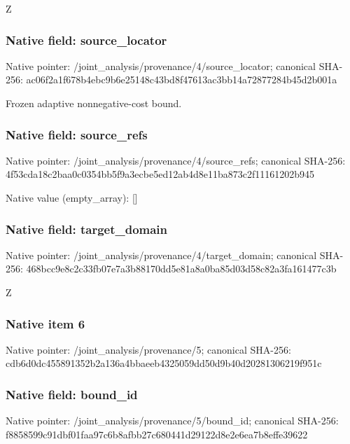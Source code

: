 \documentclass[10pt,a4paper]{article}
\begin{document}
\begingroup\raggedright\sloppy Z\par\endgroup

\subsubsection{Native field: source\_\allowbreak{}locator}
Native pointer: /joint\_\allowbreak{}analysis/provenance/4/source\_\allowbreak{}locator; canonical SHA-256: ac06f2a1f678b4ebc9b6e25148c43bd8f47613ac3bb14a72877284b45d2b001a

\begingroup\raggedright\sloppy Frozen adaptive nonnegative-cost bound.\par\endgroup

\subsubsection{Native field: source\_\allowbreak{}refs}
Native pointer: /joint\_\allowbreak{}analysis/provenance/4/source\_\allowbreak{}refs; canonical SHA-256: 4f53cda18c2baa0c0354bb5f9a3ecbe5ed12ab4d8e11ba873c2f11161202b945

Native value (empty\_\allowbreak{}array): []

\subsubsection{Native field: target\_\allowbreak{}domain}
Native pointer: /joint\_\allowbreak{}analysis/provenance/4/target\_\allowbreak{}domain; canonical SHA-256: 468bcc9e8c2c33fb07e7a3b88170dd5e81a8a0ba85d03d58c82a3fa161477c3b

\begingroup\raggedright\sloppy Z\par\endgroup

\subsubsection{Native item 6}
Native pointer: /joint\_\allowbreak{}analysis/provenance/5; canonical SHA-256: cdb6d0dc455891352b2a136a4bbaeeb4325059dd50d9b40d20281306219f951c

\subsubsection{Native field: bound\_\allowbreak{}id}
Native pointer: /joint\_\allowbreak{}analysis/provenance/5/bound\_\allowbreak{}id; canonical SHA-256: f8858599c91dbf01faa97c6b8afbb27c680441d29122d8e2e6ea7b8effe39622
\end{document}
